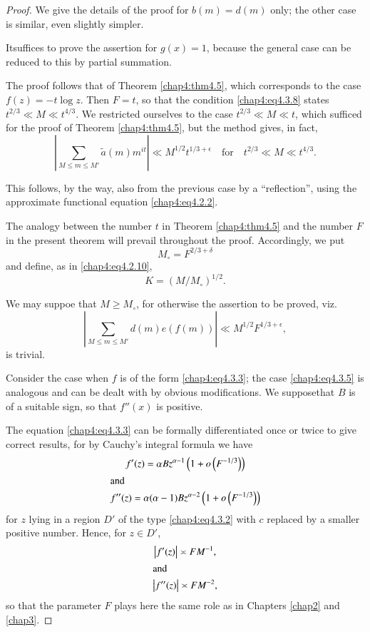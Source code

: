 \begin{proof}
We give the details of the proof for $b(m)=d(m)$ only; the other case is similar, even slightly simpler. 

It\pageoriginale suffices to prove the assertion for $g(x)=1$, because the general case can be reduced to this by partial summation.

The proof follows that of Theorem \ref{chap4:thm4.5}, which corresponds to the case $f(z)= -t\log z$. Then $F=t$, so that the condition \eqref{chap4:eq4.3.8} states $t^{2/3}\ll M\ll t^{4/3}$. We restricted ourselves to the case $t^{2/3}\ll M\ll t$, which sufficed for the proof of Theorem \ref{chap4:thm4.5}, but the method gives, in fact,
$$
\left|\sum\limits_{M\leq m\leq M'}\tilde{a}(m)m^{it}\right|\ll M^{1/2} t^{1/3+\epsilon}\quad\text{for}\quad t^{2/3}\ll M\ll t^{4/3}.
$$

This follows, by the way, also from the previous case by a ``reflection'', using the approximate functional equation \eqref{chap4:eq4.2.2}.

The analogy between the number $t$ in Theorem \ref{chap4:thm4.5} and the number $F$ in the present theorem will prevail throughout the proof. Accordingly, we put
$$
M_\circ=F^{2/3+\delta}
$$
and define, as in \eqref{chap4:eq4.2.10},
\begin{equation}\label{chap4:eq4.3.10}
K=\left(M/M_\circ\right)^{1/2}.
\end{equation}

We may suppoe that $M\geq M_\circ$, for otherwise the assertion to be proved, viz.
\begin{equation}\label{chap4:eq4.3.11}
\left|\sum\limits_{M\leq m\leq M'}d(m)e(f(m))\right|\ll M^{1/2}F^{1/3+\epsilon},
\end{equation}
is trivial.

Consider the case when $f$ is of the form \eqref{chap4:eq4.3.3}; the
case \eqref{chap4:eq4.3.5} is analogous and can be dealt with by
obvious modifications. We suppose\pageoriginale that $B$ is of a
suitable sign, so that $f''(x)$ is positive. 

The equation \eqref{chap4:eq4.3.3} can be formally differentiated once or twice to give correct results, for by Cauchy's integral formula we have 
\begin{gather}
f'(z)=\alpha Bz^{\alpha-1}\left(1+o\left(F^{-1/3}\right) \right)\label{chap4:eq4.3.12}\\
\intertext{and}
f''(z)=\alpha(\alpha-1)Bz^{\alpha-2}\left(1+o\left(F^{-1/3}\right) \right)\label{chap4:eq4.3.13}
\end{gather}
for $z$ lying in a region $D'$ of the type \eqref{chap4:eq4.3.2} with $c$ replaced by a smaller positive number. Hence, for $z\in D'$, 
\begin{gather}
\left|f'(z)\right|\asymp FM^{-1},\label{chap4:eq4.3.14}\\
\intertext{and}
\left|f''(z)\right|\asymp FM^{-2},\label{chap4:eq4.3.15}
\end{gather}
so that the parameter $F$ plays here the same role as in Chapters \ref{chap2} and \ref{chap3}.


\end{proof}
